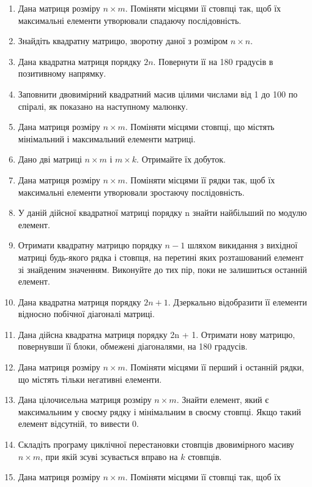 \documentclass[]{article}
\makeatletter
\newcommand{\xslalph}[1]{\expandafter\@xslalph\csname c@#1\endcsname}
\newcommand{\@xslalph}[1]{%
    \ifcase#1\or а\or б\or в\or г\or д\or e\or є\or ж\or з\or i%
    \or й\or к\or л\or м\or н\or о\or п\or р\or с\or т%
    \or у\or ф\or х\or ц\or ч\or ш\or ю\or я\or аа\or бб\or вв%
    \else\@ctrerr\fi%
}
\makeatother
\begin{document}
\begin{enumerate}
\begin{enumerate}[label=\xslalph*)]
\begin{enumerate}
\begin{enumerate}[label=\xslalph*)]
\begin{enumerate}
\def\labelenumi{\arabic{enumi})}
\item
  Дана матриця розміру $n \times m$. Поміняти місцями її стовпці так, щоб їх
  максимальні елементи утворювали спадаючу послідовність.
\item
  Знайдіть квадратну матрицю, зворотну даної з розміром $n \times n$.
\item
  Дана квадратна матриця порядку $2n$. Повернути її на 180 градусів в
  позитивному напрямку.
\item
  Заповнити двовимірний квадратний масив цілими числами від 1 до 100 по
  спіралі, як показано на наступному малюнку.
\item
  Дана матриця розміру $n \times m$. Поміняти місцями стовпці, що містять
  мінімальний і максимальний елементи матриці.
\item
  Дано дві матриці $n \times m$ і $m \times k$. Отримайте їх добуток.
\item
  Дана матриця розміру $n \times m$. Поміняти місцями її рядки так, щоб їх
  максимальні елементи утворювали зростаючу послідовність.
\item
  У даній дійсної квадратної матриці порядку n знайти найбільший по
  модулю елемент.
\item
  Отримати квадратну матрицю порядку $n - 1$ шляхом викидання з вихідної
  матриці будь-якого рядка і стовпця, на перетині яких розташований
  елемент зі знайденим значенням. Виконуйте до тих пір, поки не
  залишиться останній елемент.
\item
  Дана квадратна матриця порядку $2n + 1$. Дзеркально відобразити її
  елементи відносно побічної діагоналі матриці.
\item
  Дана дійсна квадратна матриця порядку 2n + 1. Отримати нову матрицю,
  повернувши її блоки, обмежені діагоналями, на 180 градусів.
\item
  Дана матриця розміру $n \times m$. Поміняти місцями її перший і останній
  рядки, що містять тільки негативні елементи.
\item
  Дана цілочисельна матриця розміру $n \times m$. Знайти елемент, який є
  максимальним у своєму рядку і мінімальним в своєму стовпці. Якщо такий
  елемент відсутній, то вивести 0.
\item
  Складіть програму циклічної перестановки стовпців двовимірного масиву
  $n \times m$, при якій зсуві зсувається вправо на $k$ стовпців.
\item
  Дана матриця розміру $n \times m$. Поміняти місцями її стовпці так, щоб їх

\end{enumerate}
\end{enumerate}
\end{enumerate}
\end{enumerate}
\end{enumerate}
\end{document}
